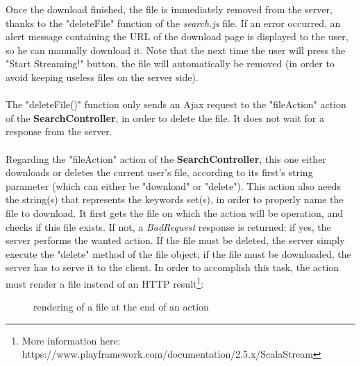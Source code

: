 \documentclass[a4paper,11pt]{report}
\begin{document}
Once the download finished, the file is immediately removed from the server, thanks to the "deleteFile" function of the \emph{search.js} file. If an error occurred, an alert message containing the URL of the download page is displayed to the user, so he can manually download it. Note that the next time the user will press the "Start Streaming!" button, the file will automatically be removed (in order to avoid keeping useless files on the server side).\\\\
The "deleteFile()" function only sends an Ajax request to the "fileAction" action of the \textbf{SearchController}, in order to delete the file. It does not wait for a response from the server.\\\\
Regarding the "fileAction" action of the \textbf{SearchController}, this one either downloads or deletes the current user's file, according to its first's string parameter (which can either be "download" or "delete"). This action also needs the string(s) that represents the keywords set(s), in order to properly name the file to download. It first gets the file on which the action will be operation, and checks if this file exists. If not, a \emph{BadRequest} response is returned; if yes, the server performs the wanted action. If the file must be deleted, the server simply execute the "delete" method of the file object; if the file must be downloaded, the server has to serve it to the client. In order to accomplish this task, the action must render a file instead of an HTTP result\footnote{More information here: https://www.playframework.com/documentation/2.5.x/ScalaStream}:
\begin{figure}[H]
\vspace{-5pt}
\begin{center}
\vspace{-5pt}
\caption{rendering of a file at the end of an action}
\end{center}
\end{figure}
\end{document}
